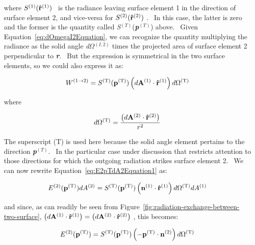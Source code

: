 where \({S^{{\rm{(1)}}}}({{\bf{\hat r}}^{{\rm{(1)}}}})\) ~is the radiance leaving surface element 1 in the direction of surface element 2, and vice-versa for \({S^{{\rm{(2)}}}}({{\bf{\hat r}}^{{\rm{(2)}}}})\) .~ In this case, the latter is zero and the former is the quantity called \emph{S}\(^{(T)}\)(\textbf{\emph{p}}\(^{(T)}\)) above.~ Given Equation~\ref{eq:dOmegaI2Equation}, we can recognize the quantity multiplying the radiance as the solid angle \emph{d}\(\Omega\)\(^{(I,2)}\) times the projected area of surface element 2 perpendicular to \textbf{\emph{r}}.~ But the expression is symmetrical in the two surface elements, so we could also express it as:

\begin{equation}
{W^{(1 \to 2)}} = {S^{{\rm{(T)}}}}({{\bf{p}}^{{\rm{(T)}}}})\left( {d{{\bf{A}}^{{\rm{(1)}}}} \cdot {{{\bf{\hat r}}}^{{\rm{(1)}}}}} \right)d{\Omega ^{{\rm{(T)}}}}
\end{equation}

where

\begin{equation}
d{\Omega ^{{\rm{(T)}}}} = \frac{{\left( {d{{\bf{A}}^{{\rm{(2)}}}} \cdot {{{\bf{\hat r}}}^{{\rm{(2)}}}}} \right)}}{{{r^2}}}
\end{equation}

The superscript (T) is used here because the solid angle element pertains to the direction \textbf{\emph{p}}\(^{(T)}\).~ In the particular case under discussion that restricts attention to those directions for which the outgoing radiation strikes surface element 2.~ We can now rewrite Equation~\ref{eq:E2pTdA2Equation1} as:

\begin{equation}
{E^{{\rm{(2)}}}}({{\bf{p}}^{{\rm{(T)}}}})d{A^{{\rm{(2)}}}} = {S^{{\rm{(T)}}}}({{\bf{p}}^{{\rm{(T)}}}})\left( {{{\bf{n}}^{{\rm{(1)}}}} \cdot {{{\bf{\hat r}}}^{{\rm{(1)}}}}} \right)d{\Omega ^{{\rm{(T)}}}}d{A^{{\rm{(1)}}}}
\label{eq:E2pTdA2Equation}
\end{equation}

and since, as can readily be seen from Figure~\ref{fig:radiation-exchange-between-two-surface}, \(\left( {d{{\bf{A}}^{{\rm{(1)}}}} \cdot {{{\bf{\hat r}}}^{{\rm{(1)}}}}} \right) = \left( {d{{\bf{A}}^{{\rm{(2)}}}} \cdot {{{\bf{\hat r}}}^{{\rm{(2)}}}}} \right)\) , this becomes:

\begin{equation}
{E^{{\rm{(2)}}}}({{\bf{p}}^{{\rm{(T)}}}}) = {S^{{\rm{(T)}}}}({{\bf{p}}^{{\rm{(T)}}}})\left( { - {{\bf{p}}^{{\rm{(T)}}}} \cdot {{\bf{n}}^{{\rm{(2)}}}}} \right)d{\Omega ^{{\rm{(T)}}}}
\end{equation}

